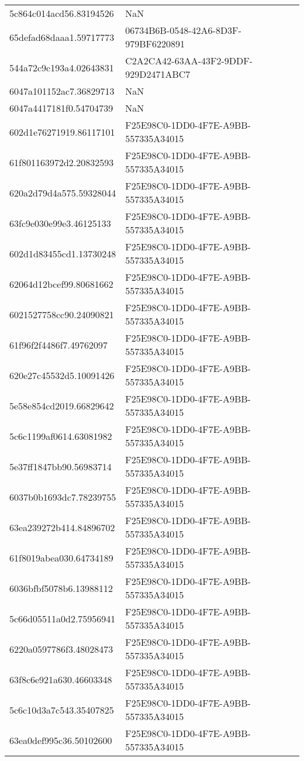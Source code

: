 \begin{tabular}{ll}
5c864c014acd56.83194526 & NaN \\
65defad68daaa1.59717773 & 06734B6B-0548-42A6-8D3F-979BF6220891 \\
544a72c9c193a4.02643831 & C2A2CA42-63AA-43F2-9DDF-929D2471ABC7 \\
6047a101152ac7.36829713 & NaN \\
6047a4417181f0.54704739 & NaN \\
602d1e76271919.86117101 & F25E98C0-1DD0-4F7E-A9BB-557335A34015 \\
61f801163972d2.20832593 & F25E98C0-1DD0-4F7E-A9BB-557335A34015 \\
620a2d79d4a575.59328044 & F25E98C0-1DD0-4F7E-A9BB-557335A34015 \\
63fc9e030e99e3.46125133 & F25E98C0-1DD0-4F7E-A9BB-557335A34015 \\
602d1d83455cd1.13730248 & F25E98C0-1DD0-4F7E-A9BB-557335A34015 \\
62064d12bcef99.80681662 & F25E98C0-1DD0-4F7E-A9BB-557335A34015 \\
6021527758cc90.24090821 & F25E98C0-1DD0-4F7E-A9BB-557335A34015 \\
61f96f2f4486f7.49762097 & F25E98C0-1DD0-4F7E-A9BB-557335A34015 \\
620e27c45532d5.10091426 & F25E98C0-1DD0-4F7E-A9BB-557335A34015 \\
5e58e854cd2019.66829642 & F25E98C0-1DD0-4F7E-A9BB-557335A34015 \\
5c6c1199af0614.63081982 & F25E98C0-1DD0-4F7E-A9BB-557335A34015 \\
5e37ff1847bb90.56983714 & F25E98C0-1DD0-4F7E-A9BB-557335A34015 \\
6037b0b1693dc7.78239755 & F25E98C0-1DD0-4F7E-A9BB-557335A34015 \\
63ea239272b414.84896702 & F25E98C0-1DD0-4F7E-A9BB-557335A34015 \\
61f8019abea030.64734189 & F25E98C0-1DD0-4F7E-A9BB-557335A34015 \\
6036bfbf5078b6.13988112 & F25E98C0-1DD0-4F7E-A9BB-557335A34015 \\
5c66d05511a0d2.75956941 & F25E98C0-1DD0-4F7E-A9BB-557335A34015 \\
6220a0597786f3.48028473 & F25E98C0-1DD0-4F7E-A9BB-557335A34015 \\
63f8c6e921a630.46603348 & F25E98C0-1DD0-4F7E-A9BB-557335A34015 \\
5c6c10d3a7c543.35407825 & F25E98C0-1DD0-4F7E-A9BB-557335A34015 \\
63ea0def995c36.50102600 & F25E98C0-1DD0-4F7E-A9BB-557335A34015 \\

\end{tabular}
